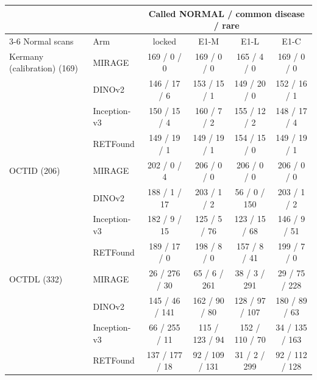 \begin{tabular}{@{}llcccc@{}}
\toprule
 & & \multicolumn{4}{c}{Called NORMAL / common disease / rare} \\
\cmidrule(l){3-6}
Normal scans & Arm & locked & E1-M & E1-L & E1-C \\
\midrule
Kermany (calibration) (169) & MIRAGE & 169 / 0 / 0 & 169 / 0 / 0 & 165 / 4 / 0 & 169 / 0 / 0 \\
 & DINOv2 & 146 / 17 / 6 & 153 / 15 / 1 & 149 / 20 / 0 & 152 / 16 / 1 \\
 & Inception-v3 & 150 / 15 / 4 & 160 / 7 / 2 & 155 / 12 / 2 & 148 / 17 / 4 \\
 & RETFound & 149 / 19 / 1 & 149 / 19 / 1 & 154 / 15 / 0 & 149 / 19 / 1 \\
\addlinespace[2pt]
OCTID (206) & MIRAGE & 202 / 0 / 4 & 206 / 0 / 0 & 206 / 0 / 0 & 206 / 0 / 0 \\
 & DINOv2 & 188 / 1 / 17 & 203 / 1 / 2 & 56 / 0 / 150 & 203 / 1 / 2 \\
 & Inception-v3 & 182 / 9 / 15 & 125 / 5 / 76 & 123 / 15 / 68 & 146 / 9 / 51 \\
 & RETFound & 189 / 17 / 0 & 198 / 8 / 0 & 157 / 8 / 41 & 199 / 7 / 0 \\
\addlinespace[2pt]
OCTDL (332) & MIRAGE & 26 / 276 / 30 & 65 / 6 / 261 & 38 / 3 / 291 & 29 / 75 / 228 \\
 & DINOv2 & 145 / 46 / 141 & 162 / 90 / 80 & 128 / 97 / 107 & 180 / 89 / 63 \\
 & Inception-v3 & 66 / 255 / 11 & 115 / 123 / 94 & 152 / 110 / 70 & 34 / 135 / 163 \\
 & RETFound & 137 / 177 / 18 & 92 / 109 / 131 & 31 / 2 / 299 & 92 / 112 / 128 \\
\bottomrule
\end{tabular}
